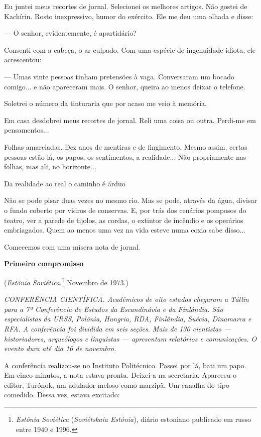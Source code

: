Eu juntei meus recortes de jornal. Selecionei os melhores artigos. Não
gostei de Kachírin. Rosto inexpressivo, humor do exército. Ele me deu
uma olhada e disse:

--- O senhor, evidentemente, é apartidário?

Consenti com a cabeça, o ar culpado. Com uma espécie de ingenuidade
idiota, ele acrescentou:

--- Umas vinte pessoas tinham pretensões à vaga. Conversaram um bocado
comigo... e não apareceram mais. O senhor, queira ao menos deixar o
telefone.

Soletrei o número da tinturaria que por acaso me veio à memória.

Em casa desdobrei meus recortes de jornal. Reli uma coisa ou outra.
Perdi-me em pensamentos...

Folhas amareladas. Dez anos de mentiras e de fingimento. Mesmo assim,
certas pessoas estão lá, os papos, os sentimentos, a realidade... Não
propriamente nas folhas, mas ali, no horizonte...

Da realidade ao real o caminho é árduo

Não se pode pisar duas vezes no mesmo rio. Mas se pode, através da água,
divisar o fundo coberto por vidros de conservas. E, por trás dos
cenários pomposos do teatro, ver a parede de tijolos, as cordas, o
extintor de incêndio e os operários embriagados. Quem ao menos uma vez
na vida esteve numa coxia sabe disso...

Comecemos com uma mísera nota de jornal.

\textbf{Primeiro compromisso}

(\emph{Estônia Soviética}.\footnote{\emph{Estônia Soviética}
  (\emph{Soviétskaia Estónia}), diário estoniano publicado em russo
  en­tre 1940 e 1996.} Novembro de 1973.)

\emph{CONFERÊNCIA CIENTÍFICA. Acadêmicos de oito estados chegaram a
Tállin para a 7ª Conferência de Estudos da Escandinávia e da Finlândia.
São especialistas da URSS, Polônia, Hungria, RDA, Finlândia, Suécia,
Dinamarca e RFA. A conferência foi dividida em seis seções. Mais de 130
cientistas --- historiadores, arqueólogos e linguistas --- apresentam
relatórios e comunicações. O evento dura até dia 16 de novembro.}

A conferência realizou-se no Instituto Politécnico. Passei por lá, bati
um papo. Em cinco minutos, a nota estava pronta. Deixei-a na secretaria.
Apareceu o editor, Turónok, um adulador meloso como marzipã. Um canalha
do tipo comedido. Dessa vez, estava excitado:


